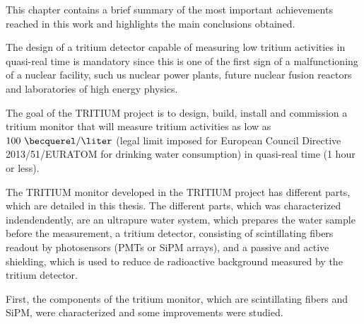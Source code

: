 This chapter contains a brief summary of the most important achievements reached in this work and highlights the main conclusions obtained.

The design of a tritium detector capable of measuring low tritium activities in quasi-real time is mandatory since this is one of the first sign of a malfunctioning of a nuclear facility, such us nuclear power plants, future nuclear fusion reactors and laboratories of high energy physics.

The goal of the TRITIUM project is to design, build, install and commission a tritium monitor that will measure tritium activities as low as $100~\becquerel/\liter$ (legal limit imposed for European Council Directive 2013/51/EURATOM for drinking water consumption) in quasi-real time (1 hour or less).

The TRITIUM monitor developed in the TRITIUM project has different parts, which are detailed in this thesis. The different parts, which was characterized indendendently, are an ultrapure water system, which prepares the water sample before the measurement, a tritium detector, consisting of scintillating fibers readout by photosensors (PMTs or SiPM arrays), and a passive and active shielding, which is used to reduce de radioactive background measured by the tritium detector.

First, the components of the tritium monitor, which are scintillating fibers and SiPM, were characterized and some improvements were studied.

